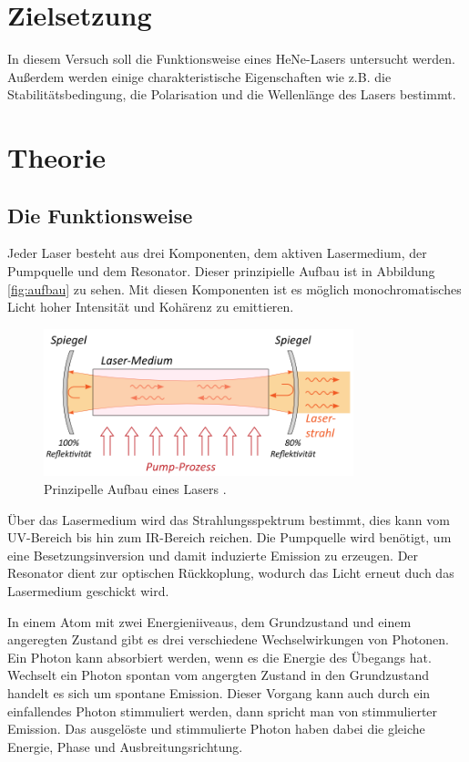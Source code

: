\section{Zielsetzung}
In diesem Versuch soll die Funktionsweise eines HeNe-Lasers untersucht werden. Außerdem werden einige
charakteristische Eigenschaften wie z.B. die Stabilitätsbedingung, die Polarisation und die
Wellenlänge des Lasers bestimmt.

\section{Theorie}
\label{sec:Theorie}
\subsection{Die Funktionsweise}
Jeder Laser besteht aus drei Komponenten, dem aktiven Lasermedium, der Pumpquelle und dem
Resonator. Dieser prinzipielle Aufbau ist in Abbildung \ref{fig:aufbau} zu sehen.
Mit diesen Komponenten ist es möglich monochromatisches Licht hoher Intensität
und Kohärenz zu emittieren.

\begin{figure}[H]
  \centering
  \includegraphics[width=9cm]{Aufbau3.png}
  \caption{Prinzipelle Aufbau eines Lasers \cite{Bachelor}.}
  \label{fif:aufbau}
\end{figure}

Über das Lasermedium wird das Strahlungsspektrum bestimmt, dies kann vom UV-Bereich bis hin
zum IR-Bereich reichen. Die Pumpquelle wird benötigt, um eine Besetzungsinversion und damit
induzierte Emission zu erzeugen. Der Resonator dient zur optischen Rückkoplung, wodurch das
Licht erneut duch das Lasermedium geschickt wird.

In einem Atom mit zwei Energieniiveaus, dem Grundzustand und einem angeregten Zustand gibt es
drei verschiedene Wechselwirkungen von Photonen. Ein Photon kann absorbiert werden, wenn es die
Energie des Übegangs hat. Wechselt ein Photon spontan vom angergten Zustand in den Grundzustand
handelt es sich um spontane Emission. Dieser Vorgang kann auch durch ein einfallendes Photon
stimmuliert werden, dann spricht man von stimmulierter Emission. Das ausgelöste und stimmulierte Photon
haben dabei die gleiche Energie, Phase und Ausbreitungsrichtung.


